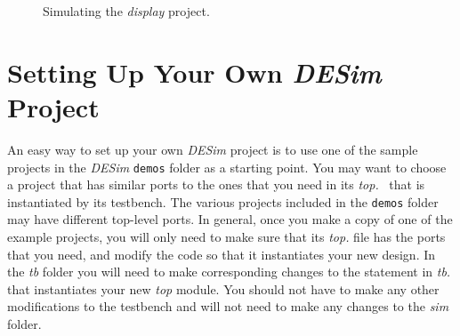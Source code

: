 {\begin{figure}[t]
	\begin{center}
        \setlength{\fboxsep}{0pt}
	\end{center}
          \caption{Simulating the {\it display} project.}
	\label{fig:sim3}
\end{figure}

\section{Setting Up Your Own {\it DESim} Project}

An easy way to set up your own {\it DESim} project is to use one of the sample projects in
the {\it DESim} \texttt{demos} folder as a starting point. You may want to choose 
a project that has similar ports to the ones that you need in its {\it top.\hdlFileExt }
\hdlModuleName~that is instantiated by its testbench. The various projects included in 
the \texttt{demos} folder may have different top-level ports. In general, once you make a
copy of one of the example projects, you will only need to make sure that its
{\it top.\hdlFileExt } file has the ports that you need, and modify the code so that it
instantiates your new design. In the {\it tb} folder you will need 
to make corresponding changes to the statement in {\it tb.\hdlFileExt } that instantiates your 
new {\it top} module.  You should not have to make any other modifications to the
testbench and will not need to make any changes to the {\it sim} folder. 

}
